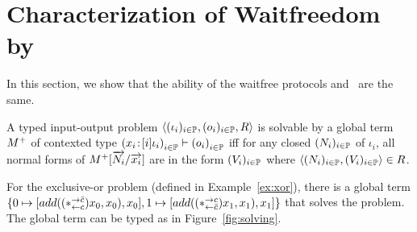 \section{Characterization of Waitfreedom by \lgd}
\label{comparison}

In this section,
we show that the ability of the waitfree protocols and \lgd\, are the same.
\begin{definition}
 \label{def:solvable}
 A typed input-output problem
 $\langle{(\iota_i)_{i\in \mathbb{P}}, (o_i)_{i\in \mathbb{P}}, R}\rangle$ is
 solvable by a global term
 ${M}^+$ of contexted type
 $\left({x_i} \mathord{\colon\kern -2pt}{[i]\iota_i}\right)_{i\in\mathbb{P}}
 \vdash\left(o_i\right)_{i\in \mathbb{P}}$ iff
 for any closed $(N_i)_{i\in \mathbb{P}}$ of $\iota_i$,
 all normal forms of ${M}^+[\overrightarrow{N_i}/\overrightarrow{x_i}]$
 are in the form $(V_i)_{i\in\mathbb{P}}$
 where $\langle{(N_i)_{i\in \mathbb{P}}, (V_i)_{i\in \mathbb{P}}}\rangle\in R$.
\end{definition}

 \begin{example}
  For the exclusive-or problem (defined in Example~\ref{ex:xor}), there is
  a global term $\{0\mapsto [{add((\ast^{\rightarrow {\bar{c}}}_{\leftarrow{c}})x_0,x_0),x_0}],
  1\mapsto[{add((\ast^{\rightarrow {c}}_{\leftarrow{\bar{c}}})x_1,x_1),x_1}]\}$ that solves the
  problem.
  The global term can be typed as in Figure~\ref{fig:solving}.
 \end{example}


